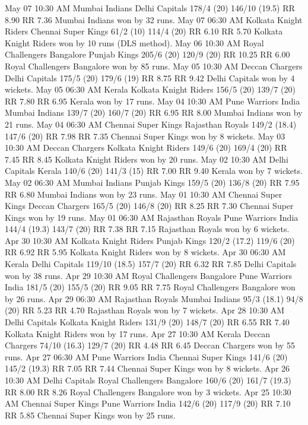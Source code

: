 May 07
10:30 AM
Mumbai Indians
Delhi Capitals
178/4 (20)
146/10 (19.5)
RR 8.90
RR 7.36
Mumbai Indians won by 32 runs.
May 07
06:30 AM
Kolkata Knight Riders
Chennai Super Kings
61/2 (10)
114/4 (20)
RR 6.10
RR 5.70
Kolkata Knight Riders won by 10 runs (DLS method).
May 06
10:30 AM
Royal Challengers Bangalore
Punjab Kings
205/6 (20)
120/9 (20)
RR 10.25
RR 6.00
Royal Challengers Bangalore won by 85 runs.
May 05
10:30 AM
Deccan Chargers
Delhi Capitals
175/5 (20)
179/6 (19)
RR 8.75
RR 9.42
Delhi Capitals won by 4 wickets.
May 05
06:30 AM
Kerala
Kolkata Knight Riders
156/5 (20)
139/7 (20)
RR 7.80
RR 6.95
Kerala won by 17 runs.
May 04
10:30 AM
Pune Warriors India
Mumbai Indians
139/7 (20)
160/7 (20)
RR 6.95
RR 8.00
Mumbai Indians won by 21 runs.
May 04
06:30 AM
Chennai Super Kings
Rajasthan Royals
149/2 (18.4)
147/6 (20)
RR 7.98
RR 7.35
Chennai Super Kings won by 8 wickets.
May 03
10:30 AM
Deccan Chargers
Kolkata Knight Riders
149/6 (20)
169/4 (20)
RR 7.45
RR 8.45
Kolkata Knight Riders won by 20 runs.
May 02
10:30 AM
Delhi Capitals
Kerala
140/6 (20)
141/3 (15)
RR 7.00
RR 9.40
Kerala won by 7 wickets.
May 02
06:30 AM
Mumbai Indians
Punjab Kings
159/5 (20)
136/8 (20)
RR 7.95
RR 6.80
Mumbai Indians won by 23 runs.
May 01
10:30 AM
Chennai Super Kings
Deccan Chargers
165/5 (20)
146/8 (20)
RR 8.25
RR 7.30
Chennai Super Kings won by 19 runs.
May 01
06:30 AM
Rajasthan Royals
Pune Warriors India
144/4 (19.3)
143/7 (20)
RR 7.38
RR 7.15
Rajasthan Royals won by 6 wickets.
Apr 30
10:30 AM
Kolkata Knight Riders
Punjab Kings
120/2 (17.2)
119/6 (20)
RR 6.92
RR 5.95
Kolkata Knight Riders won by 8 wickets.
Apr 30
06:30 AM
Kerala
Delhi Capitals
119/10 (18.5)
157/7 (20)
RR 6.32
RR 7.85
Delhi Capitals won by 38 runs.
Apr 29
10:30 AM
Royal Challengers Bangalore
Pune Warriors India
181/5 (20)
155/5 (20)
RR 9.05
RR 7.75
Royal Challengers Bangalore won by 26 runs.
Apr 29
06:30 AM
Rajasthan Royals
Mumbai Indians
95/3 (18.1)
94/8 (20)
RR 5.23
RR 4.70
Rajasthan Royals won by 7 wickets.
Apr 28
10:30 AM
Delhi Capitals
Kolkata Knight Riders
131/9 (20)
148/7 (20)
RR 6.55
RR 7.40
Kolkata Knight Riders won by 17 runs.
Apr 27
10:30 AM
Kerala
Deccan Chargers
74/10 (16.3)
129/7 (20)
RR 4.48
RR 6.45
Deccan Chargers won by 55 runs.
Apr 27
06:30 AM
Pune Warriors India
Chennai Super Kings
141/6 (20)
145/2 (19.3)
RR 7.05
RR 7.44
Chennai Super Kings won by 8 wickets.
Apr 26
10:30 AM
Delhi Capitals
Royal Challengers Bangalore
160/6 (20)
161/7 (19.3)
RR 8.00
RR 8.26
Royal Challengers Bangalore won by 3 wickets.
Apr 25
10:30 AM
Chennai Super Kings
Pune Warriors India
142/6 (20)
117/9 (20)
RR 7.10
RR 5.85
Chennai Super Kings won by 25 runs.
